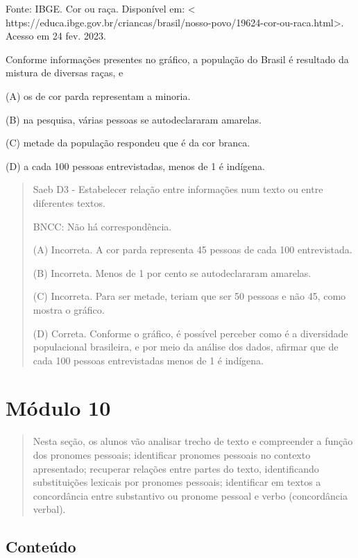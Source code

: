 \protect\hypertarget{_Hlk40547643}{}{}

Fonte: IBGE. Cor ou raça. Disponível em: \textless{}
https://educa.ibge.gov.br/criancas/brasil/nosso-povo/19624-cor-ou-raca.html\textgreater{}.
Acesso em 24 fev. 2023.

Conforme informações presentes no gráfico, a população do Brasil é
resultado da mistura de diversas raças, e

(A) os de cor parda representam a minoria.

(B) na pesquisa, várias pessoas se autodeclararam amarelas.

(C) metade da população respondeu que é da cor branca.

(D) a cada 100 pessoas entrevistadas, menos de 1 é indígena.

\begin{quote}
Saeb D3 - Estabelecer relação entre informações num texto ou entre
diferentes textos.

BNCC: Não há correspondência.

(A) Incorreta. A cor parda representa 45 pessoas de cada 100
entrevistada.

(B) Incorreta. Menos de 1 por cento se autodeclararam amarelas.

(C) Incorreta. Para ser metade, teriam que ser 50 pessoas e não 45, como
mostra o gráfico.

(D) Correta. Conforme o gráfico, é possível perceber como é a
diversidade populacional brasileira, e por meio da análise dos dados,
afirmar que de cada 100 pessoas entrevistadas menos de 1 é indígena.
\end{quote}

\section{Módulo 10}\label{muxf3dulo-10}

\begin{quote}
Nesta seção, os alunos vão analisar trecho de texto e compreender a
função dos pronomes pessoais; identificar pronomes pessoais no contexto
apresentado; recuperar relações entre partes do texto, identificando
substituições lexicais por pronomes pessoais; identificar em textos a
concordância entre substantivo ou pronome pessoal e verbo (concordância
verbal).
\end{quote}

\subsection{Conteúdo}\label{conteuxfado-9}

